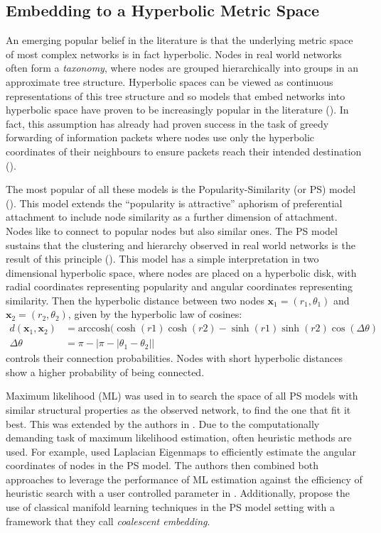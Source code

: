 \documentclass[
11pt, %
english, %
singlespacing, %
headsepline, %
]{MastersDoctoralThesis} %
\begin{document}
\subsection{Embedding to a Hyperbolic Metric Space}

An emerging popular belief in the literature is that the underlying metric space of most complex networks is in fact hyperbolic. Nodes in real world networks often form a \textit{taxonomy}, where nodes are grouped hierarchically into groups in an approximate tree structure. Hyperbolic spaces can be viewed as continuous representations of this tree structure and so models that embed networks into hyperbolic space have proven to be increasingly popular in the literature (\cite{krioukov2009curvature,krioukov2010hyperbolic}). In fact, this assumption has already had proven success in the task of greedy forwarding of information packets where nodes use only the hyperbolic coordinates of their neighbours to ensure packets reach their intended destination (\cite{papadopoulos2010greedy}). 

The most popular of all these models is the Popularity-Similarity (or PS) model (\cite{papadopoulos2011popularity}). This model extends the ``popularity is attractive'' aphorism of preferential attachment to include node similarity as a further dimension of attachment. Nodes like to connect to popular nodes but also similar ones. The PS model sustains that the clustering and hierarchy observed in real world networks is the result of this principle (\cite{alanis2016efficient}). This model has a simple interpretation in two dimensional hyperbolic space, where nodes are placed on a hyperbolic disk, with radial coordinates representing popularity and angular coordinates representing similarity. Then the hyperbolic distance between two nodes $\textbf{x}_1=(r_1, \theta_1)$ and $\textbf{x}_2=(r_2, \theta_2)$, given by  the hyperbolic law of cosines:
\begin{align}
d(\textbf{x}_1, \textbf{x}_2) &= \text{arccosh}(\cosh(r1)\cosh(r2) - \sinh(r1)\sinh(r2)\cos(\Delta\theta) \\
\Delta\theta &= \pi - | \pi - | \theta_1 - \theta_2 | |
\end{align}
controls their connection probabilities. Nodes with short hyperbolic distances show a higher probability of being connected.

Maximum likelihood (ML) was used in \cite{papadopoulos2011popularity} to search the space of all PS models with similar structural properties as the observed network, to find the one that fit it best. This was extended by the authors in \cite{papadopoulos2015network,papadopoulos2015networkgeo}. Due to the computationally demanding task of maximum likelihood estimation, often heuristic methods are used. For example, \cite{alanis2016efficient} used Laplacian Eigenmaps to efficiently estimate the angular coordinates of nodes in the PS model. The authors then combined both approaches to leverage the performance of ML estimation against the efficiency of heuristic search with a user controlled parameter in \cite{alanis2016manifold}. Additionally, \cite{thomas2016machine} propose the use of classical manifold learning techniques in the PS model setting with a framework that they call \textit{coalescent embedding}.
\end{document}
